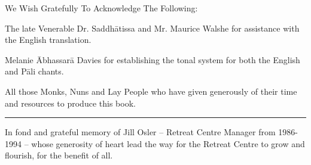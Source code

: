
\thispagestyle{empty}

{\centering

\vspace*{6\baselineskip}

\begin{minipage}{0.82\linewidth}
\setlength{\parskip}{8pt}

{\instructionFont\color{instruction} We Wish Gratefully To Acknowledge The Following:}

\bigskip

The late Venerable Dr. Saddhātissa and Mr. Maurice Walshe for assistance
with the English translation.

Melanie Ābhassarā Davies for establishing the tonal system for both the
English and Pāli chants.

All those Monks, Nuns and Lay People who have given generously of their
time and resources to produce this book.

\bigskip

{\color{footnoterule}\rule{\linewidth}{0.4pt}}

\bigskip

In fond and grateful memory of Jill Osler -- Retreat Centre Manager from
1986-1994 -- whose generosity of heart lead the way for the Retreat
Centre to grow and flourish, for the benefit of all.

\end{minipage}

}


